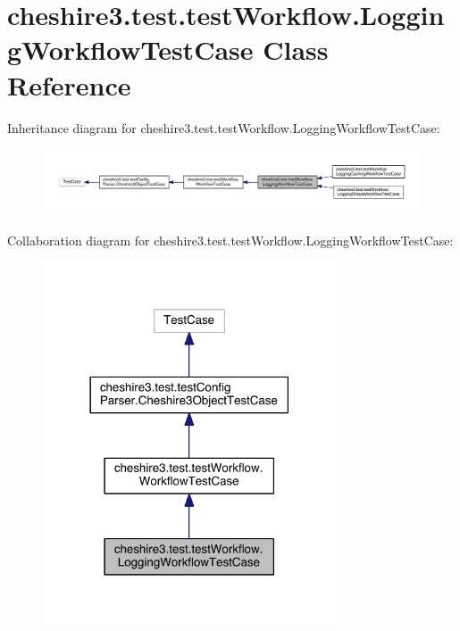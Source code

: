 \hypertarget{classcheshire3_1_1test_1_1test_workflow_1_1_logging_workflow_test_case}{\section{cheshire3.\-test.\-test\-Workflow.\-Logging\-Workflow\-Test\-Case Class Reference}
\label{classcheshire3_1_1test_1_1test_workflow_1_1_logging_workflow_test_case}
}


Inheritance diagram for cheshire3.\-test.\-test\-Workflow.\-Logging\-Workflow\-Test\-Case\-:
\nopagebreak
\begin{figure}[H]
\begin{center}
\leavevmode
\includegraphics[width=350pt]{classcheshire3_1_1test_1_1test_workflow_1_1_logging_workflow_test_case__inherit__graph}
\end{center}
\end{figure}


Collaboration diagram for cheshire3.\-test.\-test\-Workflow.\-Logging\-Workflow\-Test\-Case\-:
\nopagebreak
\begin{figure}[H]
\begin{center}
\leavevmode
\includegraphics[width=246pt]{classcheshire3_1_1test_1_1test_workflow_1_1_logging_workflow_test_case__coll__graph}
\end{center}
\end{figure}
